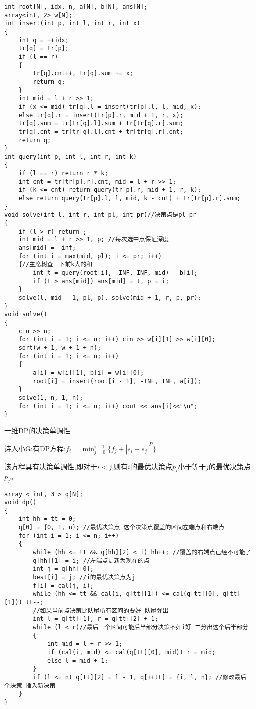 \documentclass[a4paper,fontset=none]{ctexart}
\begin{document}
\begin{verbatim}
int root[N], idx, n, a[N], b[N], ans[N];
array<int, 2> w[N];
int insert(int p, int l, int r, int x)
{
    int q = ++idx;
    tr[q] = tr[p];
    if (l == r)
    {
        tr[q].cnt++, tr[q].sum += x;
        return q;
    }
    int mid = l + r >> 1;
    if (x <= mid) tr[q].l = insert(tr[p].l, l, mid, x);
    else tr[q].r = insert(tr[p].r, mid + 1, r, x);
    tr[q].sum = tr[tr[q].l].sum + tr[tr[q].r].sum;
    tr[q].cnt = tr[tr[q].l].cnt + tr[tr[q].r].cnt;
    return q;
}
int query(int p, int l, int r, int k)
{
    if (l == r) return r * k;
    int cnt = tr[tr[p].r].cnt, mid = l + r >> 1;
    if (k <= cnt) return query(tr[p].r, mid + 1, r, k);
    else return query(tr[p].l, l, mid, k - cnt) + tr[tr[p].r].sum;
}
void solve(int l, int r, int pl, int pr)//决策点是pl pr
{
    if (l > r) return ;
    int mid = l + r >> 1, p; //每次选中点保证深度
    ans[mid] = -inf;
    for (int i = max(mid, pl); i <= pr; i++)
    {//主席树查一下前k大的和
        int t = query(root[i], -INF, INF, mid) - b[i];
        if (t > ans[mid]) ans[mid] = t, p = i;
    }
    solve(l, mid - 1, pl, p), solve(mid + 1, r, p, pr);
}
void solve()
{
    cin >> n;
    for (int i = 1; i <= n; i++) cin >> w[i][1] >> w[i][0];
    sort(w + 1, w + 1 + n);
    for (int i = 1; i <= n; i++)
    {
        a[i] = w[i][1], b[i] = w[i][0];
        root[i] = insert(root[i - 1], -INF, INF, a[i]);
    }
    solve(1, n, 1, n);
    for (int i = 1; i <= n; i++) cout << ans[i]<<"\n";
}
\end{verbatim}

一维DP的决策单调性

诗人小G:有DP方程:$f_i=\min_{j=0}^{i-1}\{f_j+|s_i-s_j|^P\}$

该方程具有决策单调性,即对于$i<j$,则有$i$的最优决策点$p_i$小于等于$j$的最优决策点$p_j$。

\begin{verbatim}
array < int, 3 > q[N];
void dp()
{
    int hh = tt = 0;
    q[0] = {0, 1, n}; //最优决策点 这个决策点覆盖的区间左端点和右端点
    for (int i = 1; i <= n; i++)
    {
        while (hh <= tt && q[hh][2] < i) hh++; //覆盖的右端点已经不可能了
        q[hh][1] = i; //左端点更新为现在的点
        int j = q[hh][0];
        best[i] = j; //i的最优决策点为j
        f[i] = cal(j, i);
        while (hh <= tt && cal(i, q[tt][1]) <= cal(q[tt][0], q[tt][1])) tt--;
        //如果当前点决策比队尾所有区间的要好 队尾弹出
        int l = q[tt][1], r = q[tt][2] + 1;
        while (l < r)//最后一个区间可能后半部分决策不如i好 二分出这个后半部分
        {
            int mid = l + r >> 1;
            if (cal(i, mid) <= cal(q[tt][0], mid)) r = mid;
            else l = mid + 1;
        }
        if (l <= n) q[tt][2] = l - 1, q[++tt] = {i, l, n}; //修改最后一个决策 插入新决策
    }
}
\end{verbatim}
\end{document}
